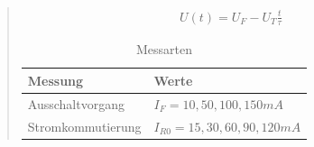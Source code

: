\begin{quote}
	\begin{equation}
         \begin{split}
             U(t)=U_{F}-U_{T}\frac{t}{\tau}
         \end{split}
         \label{eq:gerade}
    \end{equation}
	
   \newpage

      \begin{table}[h]
               \begin{addmargin}[-1cm]{3cm}
               \centering
                    \begin{tabular}{|p{5cm}|p{11.2cm}|}
         \hline
         Messung & Werte\\
         \hline
         Ausschaltvorgang & $I_{F}=10, 50, 100, 150 mA$\\

         \hline
         Stromkommutierung & $I_{R0}=15,30,60,90,120 mA$\\

         \hline


                    \end{tabular}
                \end{addmargin}
             \caption{Messarten}
          \label{Messarten}
      \end{table}

      \vspace{2em}


\end{quote}
